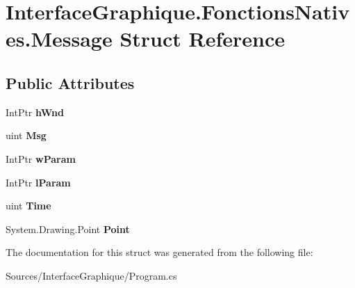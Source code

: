 \hypertarget{struct_interface_graphique_1_1_fonctions_natives_1_1_message}{}\section{Interface\+Graphique.\+Fonctions\+Natives.\+Message Struct Reference}
\label{struct_interface_graphique_1_1_fonctions_natives_1_1_message}
\subsection*{Public Attributes}
\begin{DoxyCompactItemize}
\item 
Int\+Ptr {\bfseries h\+Wnd}\hypertarget{struct_interface_graphique_1_1_fonctions_natives_1_1_message_aa25d996ad709246eecada71a0f375b21}{}\label{struct_interface_graphique_1_1_fonctions_natives_1_1_message_aa25d996ad709246eecada71a0f375b21}

\item 
uint {\bfseries Msg}\hypertarget{struct_interface_graphique_1_1_fonctions_natives_1_1_message_a1b1dfd72e58f292bbd24d6dc7a0b0f61}{}\label{struct_interface_graphique_1_1_fonctions_natives_1_1_message_a1b1dfd72e58f292bbd24d6dc7a0b0f61}

\item 
Int\+Ptr {\bfseries w\+Param}\hypertarget{struct_interface_graphique_1_1_fonctions_natives_1_1_message_aa04705defc08a7fea09f90b1cd069e20}{}\label{struct_interface_graphique_1_1_fonctions_natives_1_1_message_aa04705defc08a7fea09f90b1cd069e20}

\item 
Int\+Ptr {\bfseries l\+Param}\hypertarget{struct_interface_graphique_1_1_fonctions_natives_1_1_message_afc019b6c13559ba2a12a64e24eba9baf}{}\label{struct_interface_graphique_1_1_fonctions_natives_1_1_message_afc019b6c13559ba2a12a64e24eba9baf}

\item 
uint {\bfseries Time}\hypertarget{struct_interface_graphique_1_1_fonctions_natives_1_1_message_ae0ab10151482b01c9c5fe1cb4e8a2306}{}\label{struct_interface_graphique_1_1_fonctions_natives_1_1_message_ae0ab10151482b01c9c5fe1cb4e8a2306}

\item 
System.\+Drawing.\+Point {\bfseries Point}\hypertarget{struct_interface_graphique_1_1_fonctions_natives_1_1_message_a9dc93f6c7f6db4f91386aef27b0a77ad}{}\label{struct_interface_graphique_1_1_fonctions_natives_1_1_message_a9dc93f6c7f6db4f91386aef27b0a77ad}

\end{DoxyCompactItemize}


The documentation for this struct was generated from the following file\+:\begin{DoxyCompactItemize}
\item 
Sources/\+Interface\+Graphique/Program.\+cs\end{DoxyCompactItemize}
